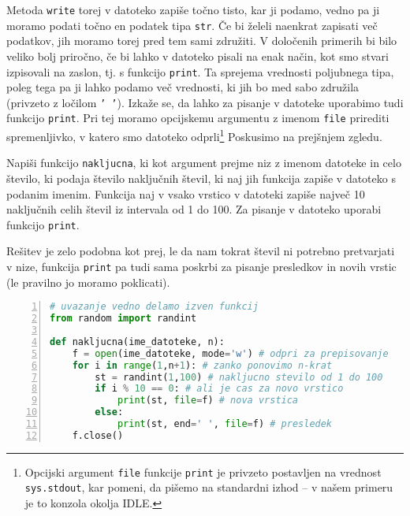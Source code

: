 Metoda \texttt{write} torej v datoteko zapiše točno tisto, kar ji podamo, vedno pa ji moramo podati točno en podatek tipa \texttt{str}. Če bi želeli naenkrat zapisati več podatkov, jih moramo torej pred tem sami združiti. V določenih primerih bi bilo veliko bolj priročno, če bi lahko v datoteko pisali na enak način, kot smo stvari izpisovali na zaslon, tj. s funkcijo \texttt{print}. Ta sprejema vrednosti poljubnega tipa, poleg tega pa ji lahko podamo več vrednosti, ki jih bo med sabo združila (privzeto z ločilom \texttt{' '}). Izkaže se, da lahko za pisanje v datoteke uporabimo tudi funkcijo \texttt{print}. Pri tej moramo opcijskemu argumentu z imenom \texttt{file} prirediti spremenljivko, v katero smo datoteko odprli\footnote{Opcijski argument \texttt{file} funkcije \texttt{print} je privzeto postavljen na vrednost \texttt{sys.stdout}, kar pomeni, da pišemo na standardni izhod -- v našem primeru je to konzola okolja IDLE.} Poskusimo na prejšnjem zgledu.
\begin{zgled}
Napiši funkcijo \texttt{nakljucna}, ki kot argument prejme niz z imenom datoteke in celo število, ki podaja število naključnih števil, ki naj jih funkcija zapiše v datoteko s podanim imenim. Funkcija naj v vsako vrstico v datoteki zapiše največ 10 naključnih celih števil iz intervala od 1 do 100. Za pisanje v datoteko uporabi funkcijo \texttt{print}.
\end{zgled}
\begin{resitev}
Rešitev je zelo podobna kot prej, le da nam tokrat števil ni potrebno pretvarjati v nize, funkcija \texttt{print} pa tudi sama poskrbi za pisanje presledkov in novih vrstic (le pravilno jo moramo poklicati).
\begin{lstlisting}[language=Python, showstringspaces=false,numbers=left]
# uvazanje vedno delamo izven funkcij
from random import randint

def nakljucna(ime_datoteke, n):
    f = open(ime_datoteke, mode='w') # odpri za prepisovanje
    for i in range(1,n+1): # zanko ponovimo n-krat
        st = randint(1,100) # nakljucno stevilo od 1 do 100
        if i % 10 == 0: # ali je cas za novo vrstico
            print(st, file=f) # nova vrstica
        else:
            print(st, end=' ', file=f) # presledek 
    f.close()
\end{lstlisting}
\end{resitev}

